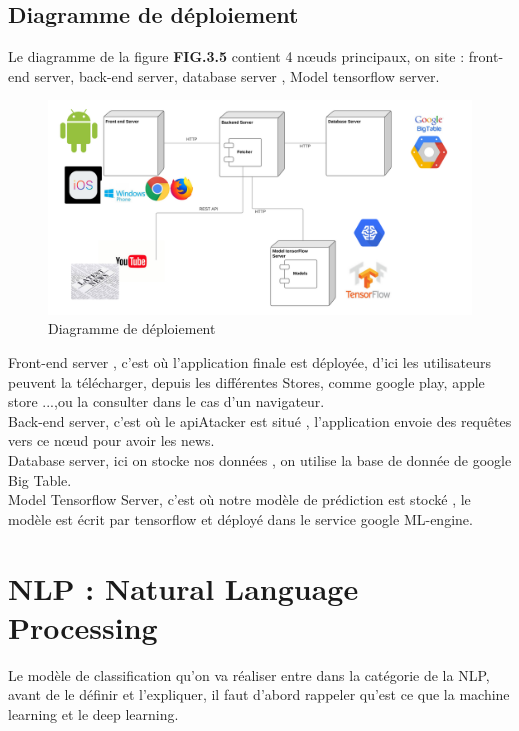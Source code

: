 \subsection{Diagramme de déploiement}
Le diagramme de la figure \textbf{FIG.3.5} contient 4 nœuds principaux, on site : front-end server, back-end server, database server , Model tensorflow server.
\begin{figure}[H]
	\includegraphics[width=\linewidth]{Images/Deployment_Diagram_Sanadtech.png}
	\caption{Diagramme de déploiement}
	\label{fig:deployment}
\end{figure}
Front-end server , c'est où l'application finale est déployée, d'ici les utilisateurs peuvent la télécharger, depuis les différentes Stores, comme google play, apple store ...,ou la consulter dans le cas d'un navigateur.\\[0.2cm]
Back-end server, c'est où le apiAtacker est situé , l'application envoie des requêtes vers ce nœud pour avoir les news.\\[0.2cm]
Database server, ici on stocke nos données , on utilise la base de donnée de google Big Table.\\[0.2cm]
Model Tensorflow Server, c'est où notre modèle de prédiction est stocké , le modèle est écrit par tensorflow et déployé dans le service google ML-engine.



\section{NLP : Natural Language Processing}
Le modèle de classification qu'on va réaliser entre  dans la catégorie de la NLP, avant de le définir et l'expliquer, il faut d'abord rappeler qu'est ce que la machine learning et le deep learning.
